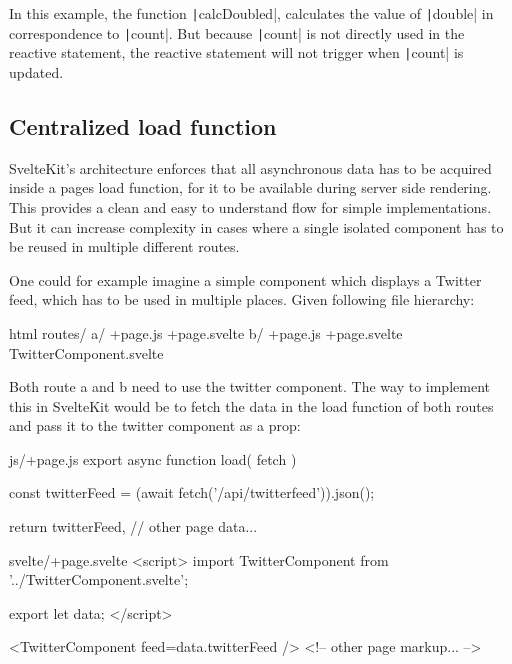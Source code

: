 In this example, the function \texttt|calcDoubled|, calculates the value of \texttt|double| in correspondence to \texttt|count|. But because \texttt|count| is not directly used in the reactive statement, the reactive statement will not trigger when \texttt|count| is updated.

\subsection{Centralized load function}

SvelteKit's architecture enforces that all asynchronous data has to be acquired inside a pages load function, for it to be available during server side rendering. This provides a clean and easy to understand flow for simple implementations. But it can increase complexity in cases where a single isolated component has to be reused in multiple different routes.

One could for example imagine a simple component which displays a Twitter feed, which has to be used in multiple places. Given following file hierarchy:

\begin{myminted}{html}{}
routes/
  a/
    +page.js
    +page.svelte
  b/
    +page.js
    +page.svelte
  TwitterComponent.svelte
\end{myminted}

Both route a and b need to use the twitter component. The way to implement this in SvelteKit would be to fetch the data in the load function of both routes and pass it to the twitter component as a prop:

\begin{myminted}{js}{/+page.js}
export async function load({ fetch }) {

    const twitterFeed = (await fetch('/api/twitterfeed')).json();

    return {
        twitterFeed,
        // other page data...
    }
}

\end{myminted}

\begin{myminted}{svelte}{/+page.svelte}
<script>
    import TwitterComponent from '../TwitterComponent.svelte';

    export let data;
</script>

<TwitterComponent feed={data.twitterFeed} />
<!-- other page markup... -->
\end{myminted}

